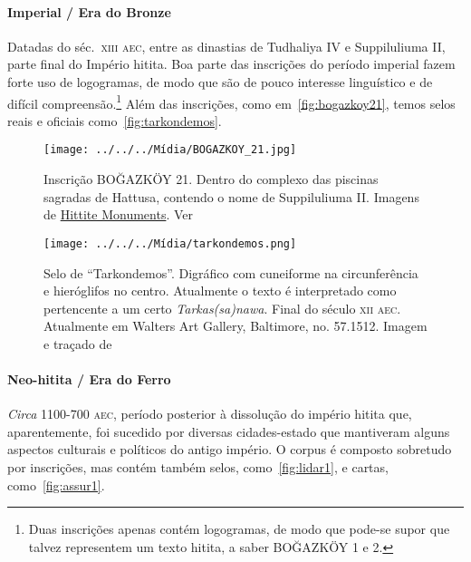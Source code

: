 \paragraph{Imperial \slash{} Era do Bronze} Datadas do séc.\ \textsc{xiii aec},
entre as dinastias de Tudhaliya IV e Suppiluliuma II, parte final do Império
hitita.
Boa parte das inscrições do período imperial fazem forte uso de logogramas,
de modo que são de pouco interesse linguístico e de difícil
compreensão.\footnote{Duas inscrições apenas contém logogramas, de modo que
	pode-se supor que talvez representem um texto hitita, a saber BOĞAZKÖY 1 e 2.}
Além das inscrições, como em~\autoref{fig:bogazkoy21},
temos selos reais e oficiais
como~\autoref{fig:tarkondemos}.

\begin{figure}[htb]
	\begin{center}
		\texttt{[image: ../../../Mídia/BOGAZKOY\_21.jpg]}
		\caption[Inscrição BOĞAZKÖY 21]{Inscrição BOĞAZKÖY 21. Dentro do complexo
			das piscinas sagradas de Hattusa, contendo o nome de Suppiluliuma II.\@
			Imagens de \href{https://www.hittitemonuments.com/bogazkoy/}{Hittite Monuments}.
			Ver~\citet[p. 48ff.]{CHLI3}
		}\label{fig:bogazkoy21}
	\end{center}
	\begin{center}
		\texttt{[image: ../../../Mídia/tarkondemos.png]}
	\end{center}
	\caption[Selo de ``Tarkondemos'']{Selo de ``Tarkondemos''. Digráfico com
		cuneiforme na circunferência e hieróglifos no centro. Atualmente o texto é
		interpretado como pertencente a um certo \emph{Tarkas{(sa)}nawa}. Final do
		século \textsc{xii aec}. Atualmente em Walters Art Gallery, Baltimore,
		no. 57.1512. Imagem e traçado de~\citet[p. 45f.; \emph{plate} 32]{CHLI3}
	}\label{fig:tarkondemos}
\end{figure}

\paragraph{Neo-hitita \slash{} Era do Ferro} \emph{Circa} 1100-700 \textsc{aec},
período posterior à dissolução do império hitita que, aparentemente, foi
sucedido por diversas cidades-estado que mantiveram alguns aspectos
culturais e políticos do antigo império.
O corpus é composto sobretudo por inscrições, mas contém também selos,
como~\autoref{fig:lidar1}, e cartas, como~\autoref{fig:assur1}.

